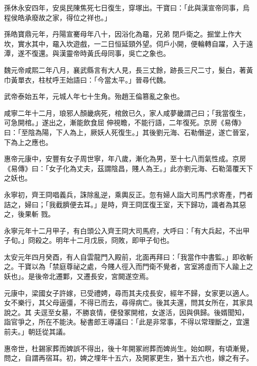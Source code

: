 \begin{pinyinscope}
 孫休永安四年，安吳民陳焦死七日復生，穿塚出。干寶曰：「此與漢宣帝同事，烏程侯皓承廢故之家，得位之祥也。」



 孫皓寶鼎元年，丹陽宣騫母年八十，因浴化為黿，兄弟
 閉戶衛之。掘堂上作大坎，實水其中，黿入坎遊戲，一二日恒延頸外望。伺戶小開，便輪轉自躍，入于遠潭，遂不復還。與漢靈帝時黃氏母同事，吳亡之象也。



 魏元帝咸熙二年八月，襄武縣言有大人見，長三丈餘，跡長三尺二寸，髮白，著黃巾黃單衣，柱杖呼王始語曰：「今當太平。」晉尋代魏。



 武帝泰始五年，元城人年七十生角。殆趙王倫篡亂之象也。



 咸寧二年十二月，琅邪人顏畿病死，棺斂已久，家人咸夢畿謂己曰；「我當復生，可急開棺。」遂出之，漸能飲食屈
 伸視瞻，不能行語，二年復死。京房《易傳》曰：「至陰為陽，下人為上，厥妖人死復生。」其後劉元海、石勒僭逆，遂亡晉室，下為上之應也。



 惠帝元康中，安豐有女子周世寧，年八歲，漸化為男，至十七八而氣性成。京房《易傳》曰：「女子化為丈夫，茲謂陰昌，賤人為王。」此亦劉元海、石勒蕩覆天下之妖也。



 永寧初，齊王冏唱義兵，誅除亂逆，乘輿反正。忽有婦人詣大司馬門求寄產，門者詰之，婦曰；「我截臍便去耳。」是時，齊王冏匡復王室，天下歸功，識者為其惡之，後果斬
 戮。



 永寧元年十二月甲子，有白頭公入齊王冏大司馬府，大呼曰：「有大兵起，不出甲子旬。」冏殺之。明年十二月戊辰，冏敗，即甲子旬也。



 太安元年四月癸酉，有人自雲龍門入殿前，北面再拜曰：「我當作中書監。」即收斬之。干寶以為「禁庭尊祕之處，今賤人徑入而門衛不覺者，宮室將虛而下人踰上之妖也」。是後帝北遷鄴，又遷長安，宮闕遂空焉。



 元康中，梁國女子許嫁，已受禮娉，尋而其夫戍長安，經年不歸，女家更以適人。女不樂行，其父母逼彊，不得已而去，尋得病亡。後其夫還，問其女所在，其家具說之。其
 夫逕至女墓，不勝哀情，便發冢開棺，女遂活，因與俱歸。後婿聞知，詣官爭之，所在不能決。秘書郎王導議曰：「此是非常事，不得以常理斷之，宜還前夫。」朝廷從其議。



 惠帝世，杜錫家葬而婢誤不得出，後十年開冢祔葬而婢尚生。始如瞑，有頃漸覺，問之，自謂再宿耳。初，婢之埋年十五六，及開冢更生，猶十五六也，嫁之有子。




\end{pinyinscope}
